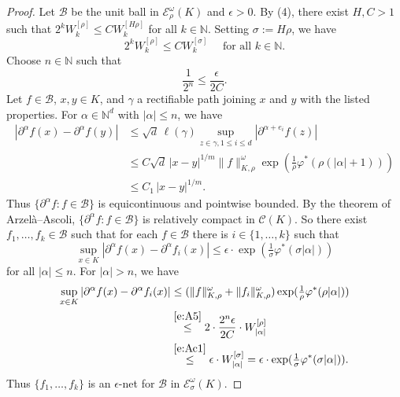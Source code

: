 \documentclass[10pt, reqno]{amsart}
\theoremstyle{plain}
\theoremstyle{definition}
\numberwithin{equation}{section}
\def\al{\alpha}
\def\ga{\gamma}
\def\ep{\epsilon}
\def\rh{\rho}
\def\si{\sigma}
\def\vh{\varphi}
\def\om{\omega}
\def\N{\mathbb{N}}
\def\cB{\mathcal{B}}
\def\cC{\mathcal{C}}
\def\cE{\mathcal{E}}
\def\p{\partial}
\begin{document}
\begin{proof}
    Let $\cB$ be the unit ball in $\cE^\om_\rh(K)$ and $\ep>0$. 
    By (4), there exist $H,C> 1$ such that $2^k W^{[\rh]}_k \le C W^{[H\rh]}_k$ for all $k \in \N$. 
    Setting $\si := H\rh$, we have 
    \begin{equation} \label{e:Ac1}
        2^k W^{[\rh]}_k \le C W^{[\si]}_k \quad \text{ for all } k \in \N.
    \end{equation}
    Choose $n \in \N$ such that 
    \begin{equation} \label{e:A5}
        \frac{1}{2^n} \le \frac{\ep}{2C}.
    \end{equation}
    Let $f \in \cB$, $x,y \in K$, and $\ga$ a rectifiable path joining $x$ and $y$ with the listed properties.
    For $\al \in \N^d$ with $|\al|\le n$, we have
    \begin{align*}
        |\p^\al f(x) - \p^\al f(y)| &\le \sqrt d\, \ell(\ga) \sup_{z \in \ga, 1\le i\le d} |\p^{\al+e_i}f(z)| 
        \\
                                    &\le C \sqrt d\, |x-y|^{1/m} \|f\|^\om_{K,\rh} \exp(\tfrac{1}{\rh} \vh^*(\rh (|\al|+1)))
                                    \\
                                    &\le C_1 \, |x-y|^{1/m}.
    \end{align*}
    Thus $\{\p^\al f : f \in \cB\}$ is equicontinuous and pointwise bounded.
    By the theorem of Arzel\`a--Ascoli, 
    $\{\p^\al f : f \in \cB\}$ is relatively compact in $\cC(K)$. 
    So there exist $f_1,\ldots,f_k \in \cB$ such that for each $f \in \cB$ there is $i \in \{1,\ldots,k\}$
    such that
    \[
        \sup_{x \in K}|\p^\al f(x) -\p^\al f_{i}(x)| \le \ep \cdot \exp(\tfrac{1}{\si} \vh^*(\si |\al|))
    \]
    for all $|\al|\le n$. 
    For $|\al|>n$, we have  
    \begin{align*}
        \sup_{x \in K}|\p^\al f(x) -\p^\al f_{i}(x)| &\le (\|f\|^\om_{K,\rh} + \|f_i\|^\om_{K,\rh}) \exp(\tfrac{1}{\rh} \vh^*(\rh |\al|))
        \\
                                                     &\stackrel{\eqref{e:A5}}{\le} 2 \cdot \frac{2^n \ep}{2C} \cdot W^{[\rh]}_{|\al|} 
                                                     \\
                                                     &\stackrel{\eqref{e:Ac1}}{\le} \ep \cdot W^{[\si]}_{|\al|} = \ep \cdot \exp(\tfrac{1}{\si} \vh^*(\si |\al|)).
    \end{align*} 
    Thus $\{f_1,\ldots,f_k\}$ is an $\ep$-net for $\cB$ in $\cE^\om_{\si}(K)$.
\end{proof} 
\end{document}
